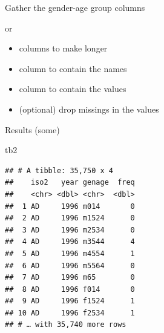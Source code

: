 \documentclass[ignorenonframetext,]{beamer}
\newenvironment{Shaded}{\begin{snugshade}}{\end{snugshade}}
\newcommand{\DataTypeTok}[1]{\textcolor[rgb]{0.13,0.29,0.53}{#1}}
\newcommand{\KeywordTok}[1]{\textcolor[rgb]{0.13,0.29,0.53}{\textbf{#1}}}
\newcommand{\NormalTok}[1]{#1}
\newcommand{\OperatorTok}[1]{\textcolor[rgb]{0.81,0.36,0.00}{\textbf{#1}}}
\newcommand{\StringTok}[1]{\textcolor[rgb]{0.31,0.60,0.02}{#1}}
\providecommand{\tightlist}{%
  \setlength{\itemsep}{0pt}\setlength{\parskip}{0pt}}
\begin{document}
\begin{frame}[fragile]{Gather the gender-age group columns}
\protect\hypertarget{gather-the-gender-age-group-columns}{}

\begin{Shaded}
\end{Shaded}

or

\begin{Shaded}
\end{Shaded}

\begin{itemize}
\tightlist
\item
  columns to make longer
\item
  column to contain the names
\item
  column to contain the values
\item
  (optional) drop missings in the values
\end{itemize}

\end{frame}

\begin{frame}[fragile]{Results (some)}
\protect\hypertarget{results-some}{}

\begin{Shaded}
\begin{Highlighting}[]
\NormalTok{tb2}
\end{Highlighting}
\end{Shaded}

\begin{verbatim}
## # A tibble: 35,750 x 4
##    iso2   year genage  freq
##    <chr> <dbl> <chr>  <dbl>
##  1 AD     1996 m014       0
##  2 AD     1996 m1524      0
##  3 AD     1996 m2534      0
##  4 AD     1996 m3544      4
##  5 AD     1996 m4554      1
##  6 AD     1996 m5564      0
##  7 AD     1996 m65        0
##  8 AD     1996 f014       0
##  9 AD     1996 f1524      1
## 10 AD     1996 f2534      1
## # … with 35,740 more rows
\end{verbatim}

\end{frame}
\end{document}
